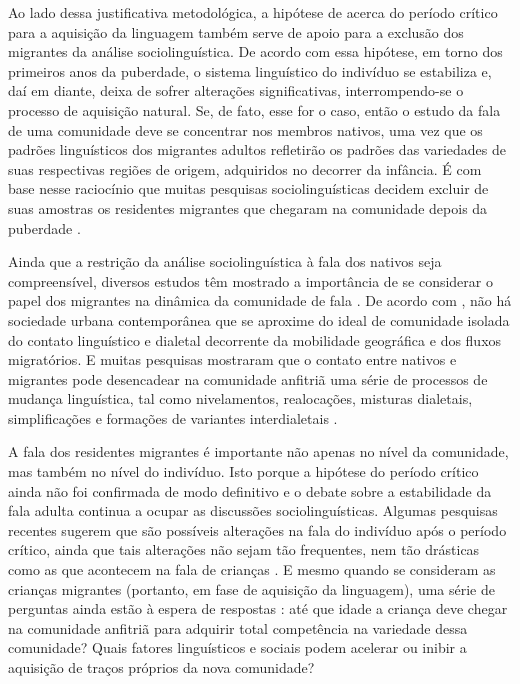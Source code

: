 \documentclass[
		a4paper,	%
		12pt,		%
		]{article}	%
\begin{document}
	Ao lado dessa justificativa metodológica, a hipótese de \citet{Lenneberg1967}
	acerca do período crítico para a aquisição da linguagem também serve de apoio
	para a exclusão dos migrantes da análise sociolinguística. De acordo com essa
	hipótese, em torno dos primeiros anos da puberdade, o sistema linguístico do
	indivíduo se estabiliza e, daí em diante, deixa de sofrer alterações
	significativas, interrompendo-se o processo de aquisição natural. Se, de fato,
	esse for o caso, então o estudo da fala de uma comunidade deve se concentrar nos
	membros nativos, uma vez que os padrões linguísticos dos migrantes adultos
	refletirão os padrões das variedades de suas respectivas regiões de origem,
	adquiridos no decorrer da infância. É com base nesse raciocínio que muitas
	pesquisas sociolinguísticas decidem excluir de suas amostras os residentes
	migrantes que chegaram na comunidade depois da puberdade \citep[p. ex.][p.
	111]{Labov1966}.%

	Ainda que a restrição da análise sociolinguística à fala dos nativos seja
	compreensível, diversos estudos têm mostrado a importância de se considerar o
	papel dos migrantes na dinâmica da comunidade de fala \citep{Britain2018,
	Bortoni-Ricardo2011, Trudgill1986}. De acordo com \citet{Milroy2002}, não há
	sociedade urbana contemporânea que se aproxime do ideal de comunidade isolada do
	contato linguístico e dialetal decorrente da mobilidade geográfica e dos fluxos
	migratórios. E muitas pesquisas mostraram que o contato entre nativos e
	migrantes pode desencadear na comunidade anfitriã uma série de processos de
	mudança linguística, tal como nivelamentos, realocações, misturas dialetais,
	simplificações e formações de variantes interdialetais \citep{Trudgill1986}.

	A fala dos residentes migrantes é importante não apenas no nível da
	comunidade, mas também no nível do indivíduo. Isto porque a hipótese do
	período crítico \citep{Lenneberg1967} ainda não foi confirmada de modo
	definitivo e o debate sobre a estabilidade da fala adulta continua a ocupar
	as discussões sociolinguísticas. Algumas pesquisas recentes sugerem que são
	possíveis alterações na fala do indivíduo após o período crítico, ainda que
	tais alterações não sejam tão frequentes, nem tão drásticas como as que
	acontecem na fala de crianças \citep{Cukor-Avila.Bailey2013}. E mesmo quando
	se consideram as crianças migrantes (portanto, em fase de aquisição da
	linguagem), uma série de perguntas ainda estão à espera de respostas
	\citep{Oushiro2016, Nycz2015, Chambers1992, Trudgill1986}: até que idade a
	criança deve chegar na comunidade anfitriã para adquirir total competência
	na variedade dessa comunidade? Quais fatores linguísticos e sociais podem
	acelerar ou inibir a aquisição de traços próprios da nova comunidade?
\end{document}
